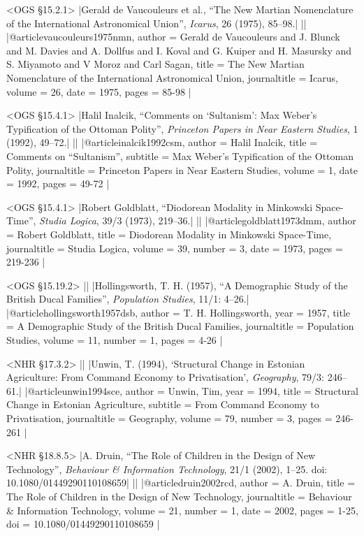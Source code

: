 \documentclass[extrafontsizes,11pt,a4paper,oneside]{memoir}
\begin{document}
\bibexample<OGS \S15.2.1>
|Gerald de Vaucouleurs et al., \enquote{The New Martian Nomenclature of the International Astronomical Union}, \emph{Icarus}, 26 (1975), 85--98.|%
||%
|@article{vaucouleurs1975nmn,
  author = {Gerald de Vaucouleurs and J. Blunck and M. Davies and A. Dollfus and I. Koval and G. Kuiper and H. Masursky and S. Miyamoto and V Moroz and Carl Sagan},
  title = {The New {Martian} Nomenclature of the {International} {Astronomical} {Union}},
  journaltitle = {Icarus},
  volume = {26},
  date = {1975},
  pages = {85-98}
}|

\bibexample<OGS \S15.4.1>
|Halil Inalcik, \enquote{Comments on \enquote{Sultanism}: Max Weber's Typification of the Ottoman Polity}, \emph{Princeton Papers in Near Eastern Studies}, 1 (1992), 49--72.|%
||%
|@article{inalcik1992csm,
  author = {Halil Inalcik},
  title = {Comments on \enquote{Sultanism}},
  subtitle = {Max Weber's Typification of the Ottoman Polity},
  journaltitle = {Princeton Papers in Near Eastern Studies},
  volume = {1},
  date = {1992},
  pages = {49-72}
}|

\bibexample<OGS \S15.4.1>
|Robert Goldblatt, \enquote{Diodorean Modality in Minkowski Space-Time}, \emph{Studia Logica}, 39/3 (1973), 219--36.|%
||%
|@article{goldblatt1973dmm,
  author = {Robert Goldblatt},
  title = {Diodorean Modality in Minkowski Space-Time},
  journaltitle = {Studia Logica},
  volume = {39},
  number = {3},
  date = {1973},
  pages = {219-236}
}|

\bibexample<OGS \S15.19.2>
||%
|Hollingsworth, T. H. (1957), \enquote{A Demographic Study of the British Ducal Families}, \emph{Population Studies}, 11/1: 4–26.|%
|@article{hollingsworth1957dsb,
  author = {T. H. Hollingsworth},
  year = {1957},
  title = {A Demographic Study of the British Ducal Families},
  journaltitle = {Population Studies},
  volume = {11},
  number = {1},
  pages = {4-26}
}|

\bibexample<NHR \S17.3.2>
||%
|Unwin, T. (1994), ‘Structural Change in Estonian Agriculture: From Command Economy to Privatisation’, \emph{Geography}, 79/3: 246–61.|%
|@article{unwin1994sce,
  author = {Unwin, Tim},
  year = {1994},
  title = {Structural Change in Estonian Agriculture},
  subtitle = {From Command Economy to Privatisation},
  journaltitle = {Geography},
  volume = {79},
  number = {3},
  pages = {246-261}
}|

\bibexample<NHR \S18.8.5>
|A. Druin, \enquote{The Role of Children in the Design of New Technology}, \emph{Behaviour \& Information Technology}, 21/1 (2002), 1–25. doi: 10.1080/01449290110108659|%
||%
|@article{druin2002rcd,
  author = {A. Druin},
  title = {The Role of Children in the Design of New Technology},
  journaltitle = {Behaviour \& Information Technology},
  volume = {21},
  number = {1},
  date = {2002},
  pages = {1-25},
  doi = {10.1080/01449290110108659}
}|
\end{document}
